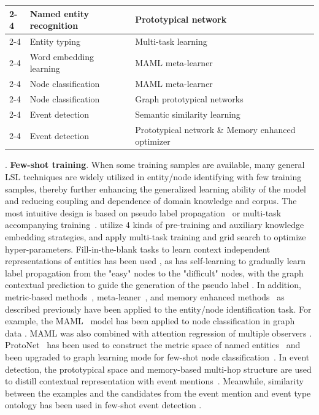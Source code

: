 \begin{table}[t]
\begin{tabular}{p{50pt}|p{90pt}|p{130pt}|p{80pt}}
\cline{2-4}
 & Named entity recognition & Prototypical network &  \\
\cline{2-4}
 & Entity typing & Multi-task learning &  \\
\cline{2-4}
 & Word embedding learning & MAML meta-learner &  \\
\cline{2-4}
 & Node classification & MAML meta-learner &  \\
\cline{2-4}
 & Node classification & Graph prototypical networks &  \\
\cline{2-4}
 & Event detection & Semantic similarity learning &  \\
\cline{2-4}
 & Event detection & Prototypical network \& Memory enhanced optimizer &  \\
\hline
\end{tabular}
\end{table}
\uppercase\expandafter{}. \textbf{Few-shot training}. When some training samples are available, many general LSL techniques are widely utilized in entity/node identifying with few training samples, thereby further enhancing the generalized learning ability of the model and reducing coupling and dependence of domain knowledge and corpus. The most intuitive design is based on pseudo label propagation~ or multi-task accompanying training~.   utilize 4 kinds of pre-training and auxiliary knowledge embedding strategies, and apply multi-task training and  grid search to optimize hyper-parameters.   Fill-in-the-blank tasks to learn context independent representations of entities has been used , as has self-learning to gradually learn label propagation from the "easy" nodes to the "difficult" nodes, with the graph contextual prediction to guide the generation of the pseudo label . In addition, metric-based methods~,  meta-leaner~, and memory enhanced methods~ as described previously have been applied to the entity/node identification task. For example, the  MAML~ model has been applied to node classification in graph data . MAML was also combined with attention regression of  multiple observers . ProtoNet~ has been used to construct the metric space of named entities~ and been upgraded to graph learning mode for few-shot node classification~. In event detection, the prototypical space and memory-based multi-hop structure are used to distill contextual representation with event mentions~. Meanwhile, similarity between the examples and the candidates from the event mention and event type ontology has been used in few-shot event detection .
